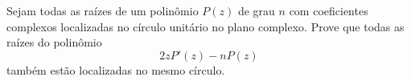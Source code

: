 Sejam todas as raízes de um polinômio \(P(z)\) de grau \(n\) com coeficientes complexos localizadas no círculo unitário no plano complexo. Prove que todas as raízes do polinômio
\[2zP'(z)-nP(z)\]
também estão localizadas no mesmo círculo.
